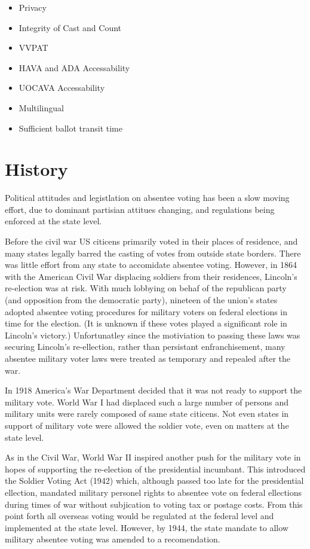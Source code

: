 \begin{itemize}
\item Privacy
\item Integrity of Cast and Count
\item VVPAT
\item HAVA and ADA Accessability
\item UOCAVA Accessability
\item Multilingual
\item Sufficient ballot transit time
\end{itemize}

\section{History}
Political attitudes and legistlation on absentee voting has been a slow moving effort, due to dominant partisian attitues changing, and regulations being enforced at the state level.

Before the civil war US citicens primarily voted in their places of residence, and many states legally barred the casting of votes from outside state borders. There was little effort from any state to accomidate absentee voting. However, in 1864 with the American Civil War displacing soldiers from their residences, Lincoln's re-election was at risk. With much lobbying on behaf of the republican party (and opposition from the democratic party), nineteen of the union's states adopted absentee voting procedures for military voters on federal elections in time for the election. (It is unknown if these votes played a significant role in Lincoln's victory.) Unfortunatley since the motiviation to passing these laws was securing Lincoln's re-ellection, rather than persistant enfranchisement, many absentee military voter laws were treated as temporary and repealed after the war.

In 1918 America's War Department decided that it was not ready to support the military vote. World War I had displaced such a large number of persons and military units were rarely composed of same state citicens. Not even states in support of military vote were allowed the soldier vote, even on matters at the state level.

As in the Civil War, World War II inspired another push for the military vote in hopes of supporting the re-election of the presidential incumbant. This introduced the Soldier Voting Act (1942) which, although passed too late for the presidential ellection, mandated military personel rights to absentee vote on federal ellections during times of war without subjication to voting tax or postage costs. From this point forth all overseas voting would be regulated at the federal level and implemented at the state level. However, by 1944, the state mandate to allow military absentee voting was amended to a recomendation.

